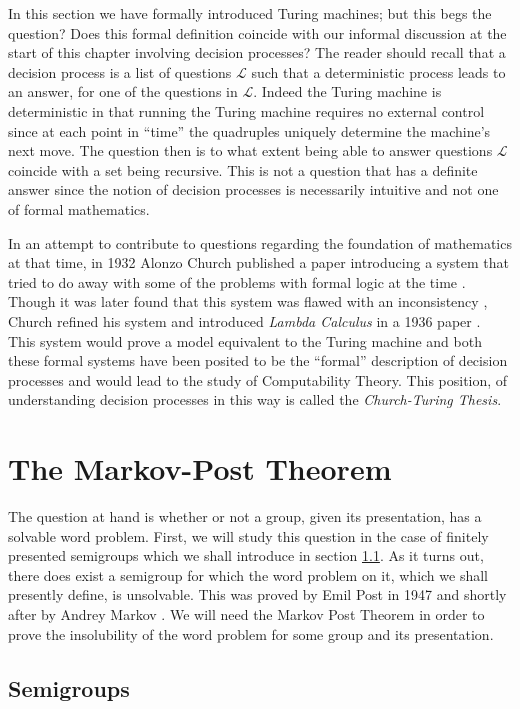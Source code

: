 In this section we have formally introduced Turing machines; but this begs the question? Does this formal definition coincide with our informal discussion at the start of this chapter involving decision processes? The reader should recall that a decision process is a list of questions $\mathcal{L}$ such that a deterministic process leads to an answer, for one of the questions in $\mathcal{L}$. Indeed the Turing machine is deterministic in that running the Turing machine requires no external control since at each point in ``time'' the quadruples uniquely determine the machine's next move. The question then is to what extent being able to answer questions $\mathcal{L}$ coincide with a set being recursive. This is not a question that has a definite answer since the notion of decision processes is necessarily intuitive and not one of formal mathematics.

In an attempt to contribute to questions regarding the foundation of mathematics at that time, in 1932 Alonzo Church published a paper introducing a system that tried to do away with some of the problems with formal logic at the time \cite{church1932}. Though it was later found that this system was flawed with an inconsistency \cite{kleene-rosser1935}, Church refined his system and introduced \emph{Lambda Calculus} in a 1936 paper \cite{church1936}. This system would prove a model equivalent to the Turing machine and both these formal systems have been posited to be the ``formal'' description of decision processes and would lead to the study of Computability Theory. This position, of understanding decision processes in this way is called the \emph{Church-Turing Thesis}.

\section{The Markov-Post Theorem}
The question at hand is whether or not a group, given its presentation, has a solvable word problem. First, we will study this question in the case of finitely presented semigroups which we shall introduce in section \ref{sec:mpt:semi}. As it turns out, there does exist a semigroup for which the word problem on it, which we shall presently define, is unsolvable. This was proved by Emil Post in 1947 \cite{post1947} and shortly after by Andrey Markov \cite{markov1951}. We will need the Markov Post Theorem in order to prove the insolubility of the word problem for some group and its presentation. 

\subsection{Semigroups}
\label{sec:mpt:semi}

